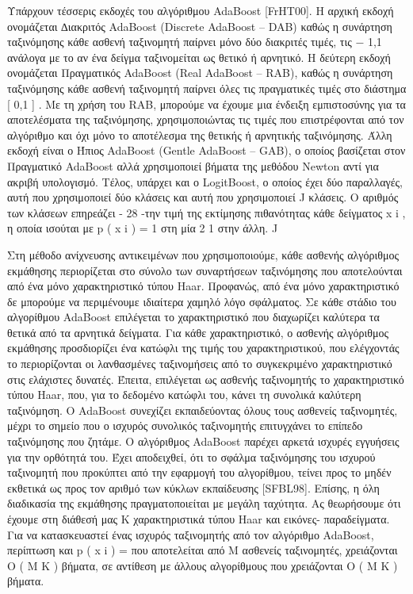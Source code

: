 Υπάρχουν τέσσερις εκδοχές του αλγόριθμου AdaBoost [FrHT00]. Η αρχική εκδοχή
ονομάζεται ∆ιακριτός AdaBoost (Discrete AdaBoost – DAB) καθώς η συνάρτηση ταξινόμησης
κάθε ασθενή ταξινομητή παίρνει μόνο δύο διακριτές τιμές, τις { − 1,1  } ανάλογα με το αν ένα
δείγμα ταξινομείται ως θετικό ή αρνητικό. Η δεύτερη εκδοχή ονομάζεται Πραγματικός AdaBoost
(Real AdaBoost – RAB), καθώς η συνάρτηση ταξινόμησης κάθε ασθενή ταξινομητή παίρνει όλες
τις πραγματικές τιμές στο διάστημα [ 0,1  ] . Με τη χρήση του RAB, μπορούμε να έχουμε μια
ένδειξη εμπιστοσύνης για τα αποτελέσματα της ταξινόμησης, χρησιμοποιώντας τις τιμές που
επιστρέφονται από τον αλγόριθμο και όχι μόνο το αποτέλεσμα της θετικής ή αρνητικής
ταξινόμησης. Άλλη εκδοχή είναι ο Ήπιος AdaBoost (Gentle AdaBoost – GAB), ο οποίος
βασίζεται στον Πραγματικό AdaBoost αλλά χρησιμοποιεί βήματα της μεθόδου Newton αντί για
ακριβή υπολογισμό. Τέλος, υπάρχει και ο LogitBoost, ο οποίος έχει δύο παραλλαγές, αυτή που
χρησιμοποιεί δύο κλάσεις και αυτή που χρησιμοποιεί J κλάσεις. Ο αριθμός των κλάσεων επηρεάζει
- 28 -την τιμή της εκτίμησης πιθανότητας κάθε δείγματος x i , η οποία ισούται με p ( x i  ) =
1
στη μία
2
1
στην άλλη.
J

Στη μέθοδο ανίχνευσης αντικειμένων που χρησιμοποιούμε, κάθε ασθενής αλγόριθμος
εκμάθησης περιορίζεται στο σύνολο των συναρτήσεων ταξινόμησης που αποτελούνται από ένα
μόνο χαρακτηριστικό τύπου Haar. Προφανώς, από ένα μόνο χαρακτηριστικό δε μπορούμε να
περιμένουμε ιδιαίτερα χαμηλό λόγο σφάλματος. Σε κάθε στάδιο του αλγορίθμου AdaBoost
επιλέγεται το χαρακτηριστικό που διαχωρίζει καλύτερα τα θετικά από τα αρνητικά δείγματα. Για
κάθε χαρακτηριστικό, ο ασθενής αλγόριθμος εκμάθησης προσδιορίζει ένα κατώφλι της τιμής του
χαρακτηριστικού, που ελέγχοντάς το περιορίζονται οι λανθασμένες ταξινομήσεις από το
συγκεκριμένο χαρακτηριστικό στις ελάχιστες δυνατές. Έπειτα, επιλέγεται ως ασθενής ταξινομητής
το χαρακτηριστικό τύπου Haar, που, για το δεδομένο κατώφλι του, κάνει τη συνολικά καλύτερη
ταξινόμηση. Ο AdaBoost συνεχίζει εκπαιδεύοντας όλους τους ασθενείς ταξινομητές, μέχρι το
σημείο που ο ισχυρός συνολικός ταξινομητής επιτυγχάνει το επίπεδο ταξινόμησης που ζητάμε.
Ο αλγόριθμος AdaBoost παρέχει αρκετά ισχυρές εγγυήσεις για την ορθότητά του. Έχει
αποδειχθεί, ότι το σφάλμα ταξινόμησης του ισχυρού ταξινομητή που προκύπτει από την εφαρμογή
του αλγορίθμου, τείνει προς το μηδέν εκθετικά ως προς τον αριθμό των κύκλων εκπαίδευσης
[SFBL98]. Επίσης, η όλη διαδικασία της εκμάθησης πραγματοποιείται με μεγάλη ταχύτητα. Ας
θεωρήσουμε ότι έχουμε στη διάθεσή μας K χαρακτηριστικά τύπου Haar και
εικόνες-
παραδείγματα. Για να κατασκευαστεί ένας ισχυρός ταξινομητής από τον αλγόριθμο AdaBoost,
περίπτωση και p ( x i  ) =
που αποτελείται από M ασθενείς ταξινομητές, χρειάζονται O ( M K  ) βήματα, σε αντίθεση με
άλλους αλγορίθμους που χρειάζονται O ( M K
)
βήματα.

